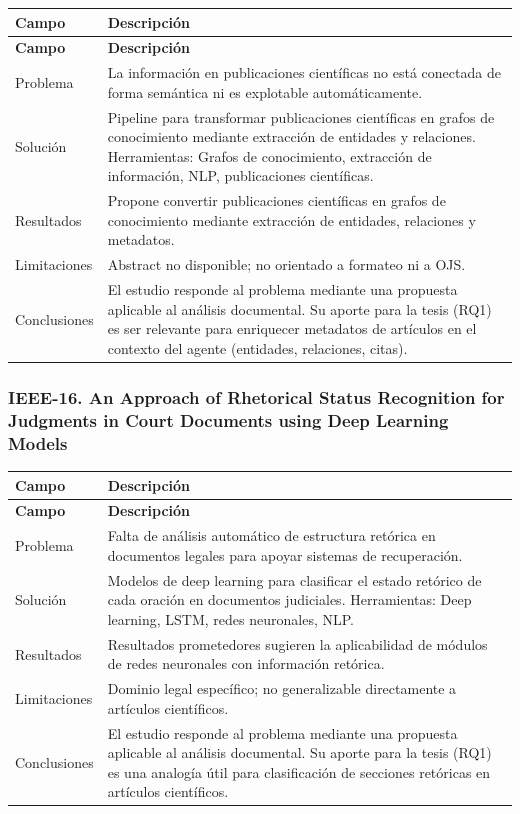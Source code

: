 \begin{longtable}{@{}>{\raggedright\arraybackslash}p{}>{\raggedright\arraybackslash}p{}@{}}
\toprule
\textbf{Campo} & \textbf{Descripción} \\
\midrule
\endfirsthead
\toprule
\textbf{Campo} & \textbf{Descripción} \\
\midrule
\endhead
\bottomrule
\endfoot
\endlastfoot
Problema & La información en publicaciones científicas no está conectada de forma semántica ni es explotable automáticamente. \\
Solución & Pipeline para transformar publicaciones científicas en grafos de conocimiento mediante extracción de entidades y relaciones. Herramientas: Grafos de conocimiento, extracción de información, NLP, publicaciones científicas. \\
Resultados & Propone convertir publicaciones científicas en grafos de conocimiento mediante extracción de entidades, relaciones y metadatos. \\
Limitaciones & Abstract no disponible; no orientado a formateo ni a OJS. \\
Conclusiones & El estudio responde al problema mediante una propuesta aplicable al análisis documental. Su aporte para la tesis (RQ1) es ser relevante para enriquecer metadatos de artículos en el contexto del agente (entidades, relaciones, citas). \\
\end{longtable}

\subsubsection*{IEEE-16. An Approach of Rhetorical Status Recognition for Judgments in Court Documents using Deep Learning Models}

\begin{longtable}{@{}>{\raggedright\arraybackslash}p{}>{\raggedright\arraybackslash}p{}@{}}
\toprule
\textbf{Campo} & \textbf{Descripción} \\
\midrule
\endfirsthead
\toprule
\textbf{Campo} & \textbf{Descripción} \\
\midrule
\endhead
\bottomrule
\endfoot
\endlastfoot
Problema & Falta de análisis automático de estructura retórica en documentos legales para apoyar sistemas de recuperación. \\
Solución & Modelos de deep learning para clasificar el estado retórico de cada oración en documentos judiciales. Herramientas: Deep learning, LSTM, redes neuronales, NLP. \\
Resultados & Resultados prometedores sugieren la aplicabilidad de módulos de redes neuronales con información retórica. \\
Limitaciones & Dominio legal específico; no generalizable directamente a artículos científicos. \\
Conclusiones & El estudio responde al problema mediante una propuesta aplicable al análisis documental. Su aporte para la tesis (RQ1) es una analogía útil para clasificación de secciones retóricas en artículos científicos. \\
\end{longtable}

